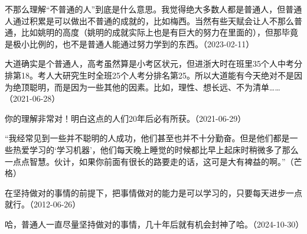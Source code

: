 不那么理解“不普通的人”到底是什么意思。我觉得绝大多数人都是普通人，但普通人通过积累是可以做出不普通的成就的，比如梅西。当然有些天赋会让人不那么普通，比如姚明的高度（姚明的成就实际上也是有巨大的努力在里面的），但那毕竟是极小比例的，也不是普通人能通过努力学到的东西。（2023-02-11）

大道确实是个普通人，高考虽然算是小考区状元，但进浙大时在班里35个人中考分排第18。考人大研究生时全班25个人考分排名第25。所以大道能有今天绝对不是因为绝顶聪明，而是因为一些其他的因素。比如，理性、想长远、不为清单……（2021-06-28）


你的理解非常对！明白这点的人们20年后必有所获。（2021-06-29）

“我经常见到一些并不聪明的人成功，他们甚至也并不十分勤奋。但是他们都是一些热爱学习的‘学习机器’，他们每天晚上睡觉的时候都比早上起床时稍微多了那么一点点智慧。伙计，如果你前面有很长的路要走的话，这可是大有裨益的啊。”（芒格）

在坚持做对的事情的前提下，把事情做对的能力是可以学习的，只要每天进步一点就行。（2012-06-26）

哈，普通人一直尽量坚持做对的事情，几十年后就有机会封神了哈。（2024-10-30）
